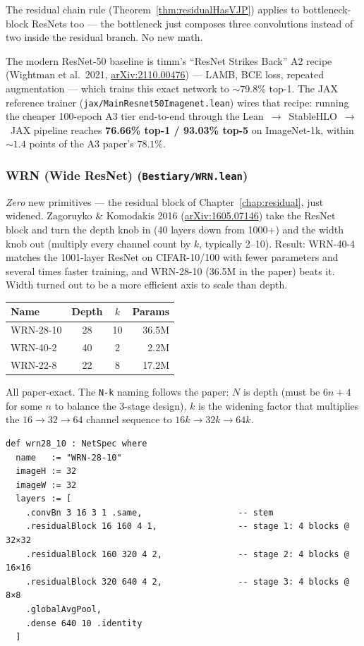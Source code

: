 The residual chain rule (Theorem~\ref{thm:residualHasVJP}) applies to
bottleneck-block ResNets too ---
the bottleneck just composes three convolutions instead of two
inside the residual branch. No new math.

The modern ResNet-50 baseline is timm's ``ResNet Strikes Back'' A2
recipe (Wightman et al.\ 2021,
\href{https://arxiv.org/abs/2110.00476}{arXiv:2110.00476}) --- LAMB,
BCE loss, repeated augmentation --- which trains this exact network
to ${\sim}79.8\%$ top-1. The JAX reference trainer
(\texttt{jax/MainResnet50Imagenet.lean}) wires that recipe: running
the cheaper 100-epoch A3 tier end-to-end through the
Lean~$\to$~StableHLO~$\to$~JAX pipeline reaches \textbf{76.66\% top-1
/ 93.03\% top-5} on ImageNet-1k, within ${\sim}1.4$ points of the A3
paper's $78.1\%$.

\subsubsection*{WRN (Wide ResNet) (\texttt{Bestiary/WRN.lean})}
\emph{Zero} new primitives --- the residual block of
Chapter~\ref{chap:residual}, just widened. Zagoruyko \& Komodakis
2016 (\href{https://arxiv.org/abs/1605.07146}{arXiv:1605.07146})
take the ResNet block and turn the depth knob in (40 layers down
from 1000+) and the width knob out (multiply every channel count
by $k$, typically 2--10). Result: WRN-40-4 matches the 1001-layer ResNet on CIFAR-10/100 with
fewer parameters and several times faster training, and WRN-28-10
(36.5M in the paper) beats it. Width turned out to be a more efficient axis to scale than
depth.

\begin{center}
\begin{tabular}{l c c r}
\hline
Name      & Depth & $k$  & Params \\
\hline
WRN-28-10 & 28    & 10   & 36.5M  \\
WRN-40-2  & 40    & 2    &  2.2M  \\
WRN-22-8  & 22    & 8    & 17.2M  \\
\hline
\end{tabular}
\end{center}

All paper-exact. The \texttt{N-k} naming follows the paper:
$N$ is depth (must be $6n+4$ for some $n$ to balance the 3-stage
design), $k$ is the widening factor that multiplies the
$16 \to 32 \to 64$ channel sequence to $16k \to 32k \to 64k$.

\begin{verbatim}
def wrn28_10 : NetSpec where
  name   := "WRN-28-10"
  imageH := 32
  imageW := 32
  layers := [
    .convBn 3 16 3 1 .same,                   -- stem
    .residualBlock 16 160 4 1,                -- stage 1: 4 blocks @ 32×32
    .residualBlock 160 320 4 2,               -- stage 2: 4 blocks @ 16×16
    .residualBlock 320 640 4 2,               -- stage 3: 4 blocks @ 8×8
    .globalAvgPool,
    .dense 640 10 .identity
  ]
\end{verbatim}

